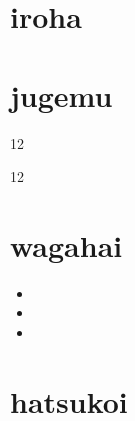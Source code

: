 \documentclass[a4paper]{ltjsarticle}
\begin{document}
\section{iroha}

\jalipsumiroha

\section{jugemu}

\begin{flushright}

\begin{parbox}[t]{12\zw}{%
\jalipsumjugemu
}%
\end{parbox}
\hspace{2cm}%
\begin{parbox}[t]{12\zw}{%
\jalipsumjugemuP
}%
\end{parbox}

\end{flushright}

\section{wagahai}

\begin{itemize}
\item {}
\item {}
\item {}
\end{itemize}

\section{hatsukoi}

\begin{quote}
\addtolength{\parskip}{\baselineskip}
\end{quote}
\end{document}
